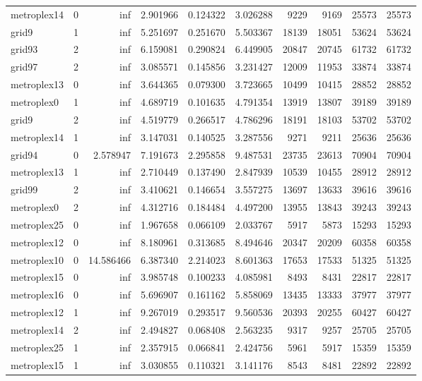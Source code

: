 \begin{longtable}{|l|r|r|r|r|r|r|r|r|r|}
metroplex14 & 0 & inf & 2.901966 & 0.124322 & 3.026288 & 9229 & 9169 & 25573 & 25573 \\
grid9 & 1 & inf & 5.251697 & 0.251670 & 5.503367 & 18139 & 18051 & 53624 & 53624 \\
grid93 & 2 & inf & 6.159081 & 0.290824 & 6.449905 & 20847 & 20745 & 61732 & 61732 \\
grid97 & 2 & inf & 3.085571 & 0.145856 & 3.231427 & 12009 & 11953 & 33874 & 33874 \\
metroplex13 & 0 & inf & 3.644365 & 0.079300 & 3.723665 & 10499 & 10415 & 28852 & 28852 \\
metroplex0 & 1 & inf & 4.689719 & 0.101635 & 4.791354 & 13919 & 13807 & 39189 & 39189 \\
grid9 & 2 & inf & 4.519779 & 0.266517 & 4.786296 & 18191 & 18103 & 53702 & 53702 \\
metroplex14 & 1 & inf & 3.147031 & 0.140525 & 3.287556 & 9271 & 9211 & 25636 & 25636 \\
grid94 & 0 & 2.578947 & 7.191673 & 2.295858 & 9.487531 & 23735 & 23613 & 70904 & 70904 \\
metroplex13 & 1 & inf & 2.710449 & 0.137490 & 2.847939 & 10539 & 10455 & 28912 & 28912 \\
grid99 & 2 & inf & 3.410621 & 0.146654 & 3.557275 & 13697 & 13633 & 39616 & 39616 \\
metroplex0 & 2 & inf & 4.312716 & 0.184484 & 4.497200 & 13955 & 13843 & 39243 & 39243 \\
metroplex25 & 0 & inf & 1.967658 & 0.066109 & 2.033767 & 5917 & 5873 & 15293 & 15293 \\
metroplex12 & 0 & inf & 8.180961 & 0.313685 & 8.494646 & 20347 & 20209 & 60358 & 60358 \\
metroplex10 & 0 & 14.586466 & 6.387340 & 2.214023 & 8.601363 & 17653 & 17533 & 51325 & 51325 \\
metroplex15 & 0 & inf & 3.985748 & 0.100233 & 4.085981 & 8493 & 8431 & 22817 & 22817 \\
metroplex16 & 0 & inf & 5.696907 & 0.161162 & 5.858069 & 13435 & 13333 & 37977 & 37977 \\
metroplex12 & 1 & inf & 9.267019 & 0.293517 & 9.560536 & 20393 & 20255 & 60427 & 60427 \\
metroplex14 & 2 & inf & 2.494827 & 0.068408 & 2.563235 & 9317 & 9257 & 25705 & 25705 \\
metroplex25 & 1 & inf & 2.357915 & 0.066841 & 2.424756 & 5961 & 5917 & 15359 & 15359 \\
metroplex15 & 1 & inf & 3.030855 & 0.110321 & 3.141176 & 8543 & 8481 & 22892 & 22892 \\

\end{longtable}

